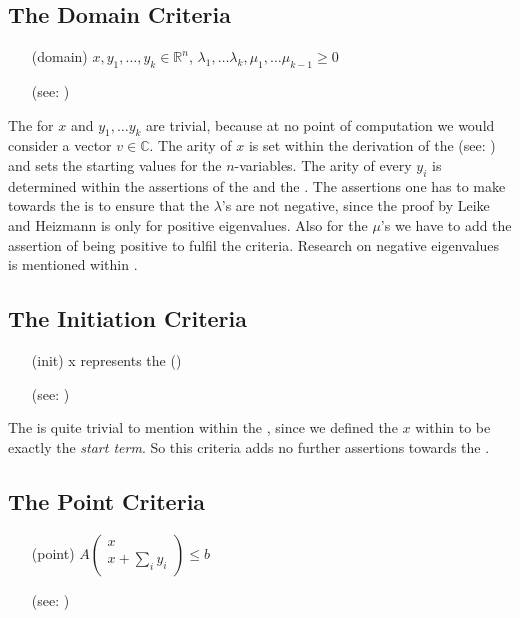 \subsection{The Domain Criteria}
\begin{itemize}
	\setlength{\itemindent}{1in}
	\item[(domain)] $x, y_1, \dots, y_k \in \mathbb{R}^n$, $\lambda_1, \dots \lambda_k, \mu_1, \dots \mu_{k-1} \ge 0$
	\item[] (see: )
\end{itemize}
The \domc for $x$ and $y_1, \dots y_k$ are trivial, because at no point of computation we would consider a vector $v\in\mathbb{C}$.
The arity of $x$ is set within the derivation of the \stem (see: ) and sets the starting values for the $n$-variables. The arity of every $y_i$ is determined within the assertions of the \pointc and the \rayc.\newline
The assertions one has to make towards the \solver is to ensure that the $\lambda$'s are not negative, since the proof by Leike and Heizmann is only for positive eigenvalues. Also for the $\mu$'s we have to add the assertion of being positive to fulfil the criteria. \newline
Research on negative eigenvalues is mentioned within .
\subsection{The Initiation Criteria}
\begin{itemize}
	\setlength{\itemindent}{1in}
	\item[(init)] x represents the \startterm (\stem)
	\item[] (see: )
\end{itemize}

The \initc is quite trivial to mention within the \solver, since we defined the \stem $x$ within  to be exactly the  \textit{start term}.\newline
So this criteria adds no further assertions towards the \solver.

\subsection{The Point Criteria}
\label{sec:point-criteria}
\begin{itemize}
	\setlength{\itemindent}{1in}
	\item[(point)] $A\begin{pmatrix} x \\ x + \sum_i y_i \end{pmatrix} \le b$
	\item[] (see: )
\end{itemize}


